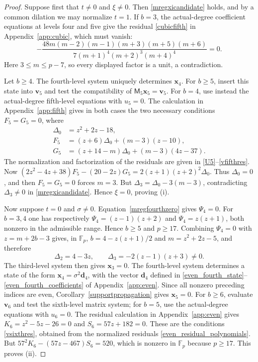 \documentclass[12pt]{article}
\theoremstyle{remark}
\newcommand{\F}{\mathbb{F}_p}
\begin{document}
\begin{proof}
Suppose first that $t\ne0$ and $\xi\ne0$.  Then
\eqref{mregxicandidate} holds, and by a common dilation we may normalize
$t=1$.  If $b=3$, the actual-degree coefficient equations at levels
four and five give the residual \eqref{cubicfifth} in
Appendix~\ref{app:cubic}, which must vanish:
\[
 -\frac{48m(m-2)(m-1)(m+3)(m+5)(m+6)}
 {7(m+1)^4(m+2)^3(m+4)^4}=0.
\]
Here $3\le m\le p-7$, so every displayed factor is a unit, a
contradiction.

Let $b\ge4$.  The fourth-level system uniquely determines
$\mathbf x_4$.  For $b\ge5$, insert this state into $\mathbf v_5$ and
test the compatibility of $\mathsf M_5\mathbf x_5=\mathbf v_5$.
For $b=4$, use instead the actual-degree fifth-level equations with
$u_5=0$.  The calculation in Appendix~\ref{app:fifth} gives in both cases the two
necessary conditions $F_5=G_5=0$, where
\[
\begin{aligned}
 \Delta_0&=z^2+2z-18,\\
 F_5&=(z+6)\Delta_0+(m-3)(z-10),\\
 G_5&=(z+14-m)\Delta_0+(m-3)(4z-37).
\end{aligned}
\]
The normalization and factorization of the residuals are given in
\eqref{U5}--\eqref{vfifthres}.  Now
$(2z^2-4z+38)F_5-(20-2z)G_5=2(z+1)(z+2)^2\Delta_0$.
Thus $\Delta_0=0$, and then $F_5=G_5=0$ forces $m=3$.  But
$\Delta_3=\Delta_0-3(m-3)$, contradicting $\Delta_3\ne0$ in \eqref{mregxicandidate}.  Hence
$\xi=0$, proving \textup{(i)}.

Now suppose $t=0$ and $\sigma\ne0$.  Equation~\eqref{mregfourthzero}
gives $\Psi_4=0$.  For $b=3,4$ one has respectively
$\Psi_4=(z-1)(z+2)$ and $\Psi_4=z(z+1)$, both nonzero in the admissible
range.  Hence $b\ge5$ and $p\ge17$.  Combining $\Psi_4=0$ with
$z=m+2b-3$ gives, in $\F$, $b=4-z(z+1)/2$ and
$m=z^2+2z-5$, and therefore
\[
 \Delta_2=4-3z,
 \qquad
 \Delta_3=-2(z-1)(z+3)\ne0.
\]
The third-level system then gives $\mathbf x_3=0$.  The fourth-level
system determines a state of the form
$\mathbf x_4=\sigma^2\mathbf d_4$, with the vector $\mathbf d_4$ defined in
\eqref{even_fourth_state}--\eqref{even_fourth_coefficients} of
Appendix~\ref{app:even}.  Since all nonzero preceding indices are even,
Corollary~\ref{supportpropagation} gives $\mathbf x_5=0$.
For $b\ge6$, evaluate $\mathbf v_6$ and test the sixth-level matrix
system; for $b=5$, use the actual-degree equations with $u_6=0$.
The residual calculation in Appendix~\ref{app:even} gives
$K_6=z^2-5z-26=0$ and $S_6=57z+182=0$.  These are the conditions \eqref{vsixthres}, obtained from the normalized
residuals \eqref{even_residual_polynomials}.  But
$57^2K_6-(57z-467)S_6=520$, which is nonzero in $\F$ because $p\ge17$.  This proves \textup{(ii)}.


\end{proof}
\end{document}

